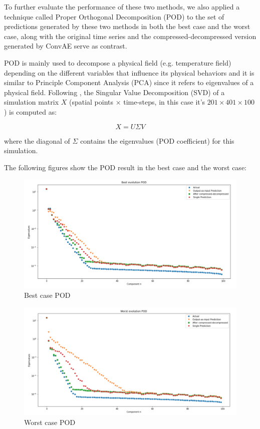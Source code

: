 To further evaluate the performance of these two methods, we also applied a technique called Proper Orthogonal Decomposition (POD) to the set of predictions generated by these two methods in both the best case and the worst case, along with the original time series and the compressed-decompressed version generated by ConvAE serve as contrast.

POD is mainly used to decompose a physical field (e.g. temperature field) depending on the different variables that influence its physical behaviors and it is similar to Principle Component Analysis (PCA) since it refers to eigenvalues of a physical field.\citep{10.1146_annurev.fl.25.010193.002543} Following \citep{10.1515_9783110671490-007}, the Singular Value Decomposition (SVD) of a simulation matrix $X$ (spatial points × time-steps, in this case it's $201 \times 401 \times 100$) is computed as:

\begin{equation}
X = U\Sigma V
\end{equation}

where the diagonal of $\Sigma$ contains the eigenvalues (POD coefficient) for this simulation.

The following figures show the POD result in the best case and the worst case:

\begin{figure}[H]
    \caption{Best case POD}
    \includegraphics[scale=0.5]{figures/mantle_convection_images/limited_dataset/FNN_Best_POD.png}
\end{figure}

\begin{figure}[H]
    \caption{Worst case POD}
    \includegraphics[scale=0.5]{figures/mantle_convection_images/limited_dataset/FNN_Worst_POD.png}
\end{figure}

